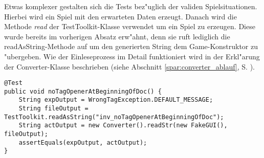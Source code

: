 Etwas komplexer gestalten sich die Tests bez"uglich der validen Spielsituationen. Hierbei wird ein Spiel mit den erwarteten Daten erzeugt. Danach wird die Methode \emph{read} der TestToolkit-Klasse verwendet um ein Spiel zu erzeugen. Diese wurde bereits im vorherigen Absatz erw"ahnt, denn sie ruft lediglich die readAsString-Methode auf um den generierten String dem Game-Konstruktor zu "ubergeben. Wie der Einleseprozess im Detail funktioniert wird in der Erkl"arung der Converter-Klasse beschrieben (siehe Abschnitt \ref{spar:converter_ablauf}, S. \pageref{spar:converter_ablauf}).





\begin{lstlisting}[float,style=CodeHighlighting,caption=InvalidFileReadTests - test\_noTagOpenerAtBeginningOfDoc,label=lst:test_noTagOpenerAtBeginningOfDoc]
@Test
public void noTagOpenerAtBeginningOfDoc() {
    String expOutput = WrongTagException.DEFAULT_MESSAGE;
    String fileOutput = TestToolkit.readAsString("inv_noTagOpenerAtBeginningOfDoc");
    String actOutput = new Converter().readStr(new FakeGUI(), fileOutput);
    assertEquals(expOutput, actOutput);
}
\end{lstlisting}